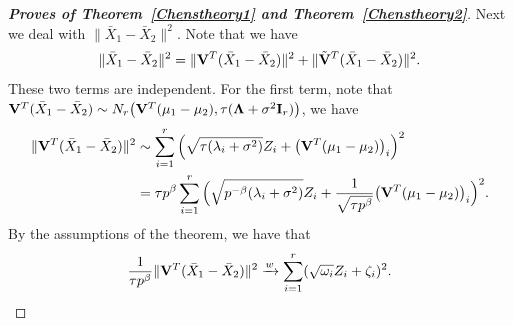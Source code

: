 \documentclass[review]{elsarticle}
\theoremstyle{plain}
\theoremstyle{definition}
\theoremstyle{remark}
\begin{document}
\begin{proof}[\textbf{Proves of Theorem~\ref{Chenstheory1} and Theorem~\ref{Chenstheory2}}]
    Next we deal with $\|\bar{X}_1-\bar{X}_2\|^2$.
    Note that we have
    $$
    \|\bar{X}_1-\bar{X}_2\|^2=
    \|\mathbf{V}^T(\bar{X}_1-\bar{X}_2)\|^2+
    \|\tilde{\mathbf{V}}^T(\bar{X}_1-\bar{X}_2)\|^2.
    $$
    These two terms are independent.
    For the first term, note that $\mathbf{V}^T(\bar{X}_1-\bar{X}_2)\sim N_r\big(\mathbf{V}^T (\mu_1-\mu_2),\tau (\boldsymbol{\Lambda}+\sigma^2 \mathbf{I}_r)\big)$, we have
    $$
    \begin{aligned}
        \|\mathbf{V}^T(\bar{X}_1-\bar{X}_2)\|^2&\sim
        \sum_{i=1}^r \Big(\sqrt{\tau (\lambda_i+\sigma^2)}Z_i+\big(\mathbf{V}^T (\mu_1-\mu_2)\big)_i \Big)^2\\
        &=\tau p^{\beta}
        \sum_{i=1}^r
        \Big( \sqrt{p^{-\beta}(\lambda_i+\sigma^2)}Z_i+\frac{1}{\sqrt{\tau p^{\beta}}}\big(\mathbf{V}^T (\mu_1-\mu_2)\big)_i \Big)^2.
    \end{aligned}
    $$
    By the assumptions of the theorem,  we have that
    \begin{equation}\label{eq:kkk2}
    \begin{aligned}
        \frac{1}{\tau p^{\beta}}\|\mathbf{V}^T(\bar{X}_1-\bar{X}_2)\|^2
        \xrightarrow{w}
        \sum_{i=1}^r (\sqrt{\omega_i} Z_i+\zeta_i)^2.
    \end{aligned}
    \end{equation}


\end{proof}
\end{document}
